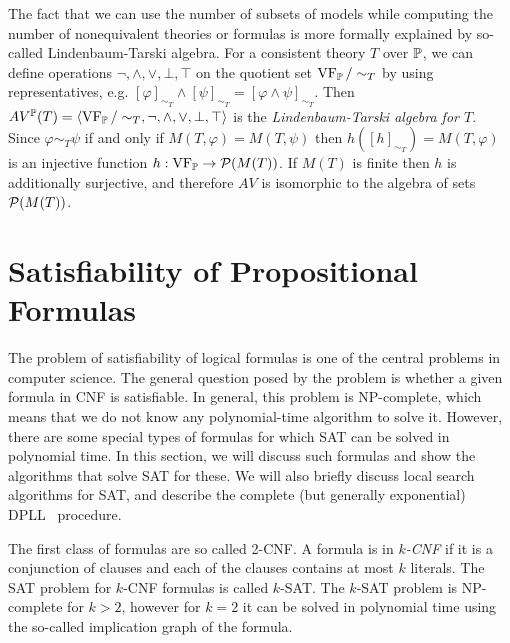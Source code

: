 The fact that we can use the number of subsets of models while computing the number of nonequivalent theories or formulas is more formally explained by so-called Lindenbaum-Tarski algebra. For a consistent theory $T$ over $\mathbb{P}$, we can define operations $\neg, \land, \lor, \bot, \top$ on the quotient set $\operatorname{VF}_\mathbb{P}/\sim_T$ by using representatives, e.g. $[\varphi]_{\sim_T} \land [\psi]_{\sim_T} = [\varphi \land \psi]_{\sim_T}$. Then $AV^\mathbb{P}(T) = \langle \operatorname{VF}_\mathbb{P}/\sim_T, \neg, \land, \lor, \bot, \top \rangle$ is the \emph{Lindenbaum-Tarski algebra for $T$}. Since $\varphi \sim_T \psi$ if and only if $M(T, \varphi) = M(T, \psi)$ then $h([h]_{\sim_T}) = M(T, \varphi)$ is an injective function $h: \operatorname{VF}_\mathbb{P} \to \mathcal{P}(M(T))$. If $M(T)$ is finite then $h$ is additionally surjective, and therefore $AV$ is isomorphic to the algebra of sets $\mathcal{P}(M(T))$.


\section{Satisfiability of Propositional Formulas}

The problem of satisfiability of logical formulas is one of the central problems in computer science. The general question posed by the problem is whether a given formula in CNF is satisfiable. In general, this problem is NP-complete, which means that we do not know any polynomial-time algorithm to solve it. However, there are some special types of formulas for which SAT can be solved in polynomial time. In this section, we will discuss such formulas and show the algorithms that solve SAT for these. We will also briefly discuss local search algorithms for SAT, and describe the complete (but generally exponential) DPLL~ procedure.

The first class of formulas are so called 2-CNF. A formula is in \emph{$k$-CNF} if it is a conjunction of clauses and each of the clauses contains at most $k$ literals. The SAT problem for $k$-CNF formulas is called $k$-SAT. The $k$-SAT problem is NP-complete for $k>2$, however for $k=2$ it can be solved in polynomial time using the so-called implication graph of the formula. 

